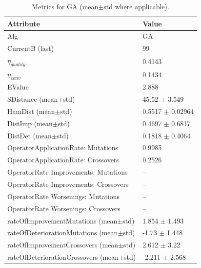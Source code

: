 \begin{table}[t]
\centering
\small
\begin{tabular}{ll}
\toprule
Attribute & Value \\
\midrule
Alg & GA \\
CurrentB (last) & 99 \\
$\eta_{quality}$ & 0.4143 \\
$\eta_{conv}$ & 0.1434 \\
EValue & 2.888 \\
SDistance (mean$\pm$std) & 45.52 $\pm$ 3.549 \\
HamDist (mean$\pm$std) & 0.5517 $\pm$ 0.02964 \\
DistImp (mean$\pm$std) & 0.4697 $\pm$ 0.6817 \\
DistDet (mean$\pm$std) & 0.1818 $\pm$ 0.4064 \\
OperatorApplicationRate: Mutations & 0.9985 \\
OperatorApplicationRate: Crossovers & 0.2526 \\
OperatorRate Improvements: Mutations & -- \\
OperatorRate Improvements: Crossovers & -- \\
OperatorRate Worsenings: Mutations & -- \\
OperatorRate Worsenings: Crossovers & -- \\
rateOfImprovementMutations (mean$\pm$std) & 1.854 $\pm$ 1.493 \\
rateOfDeteriorationMutations (mean$\pm$std) & -1.73 $\pm$ 1.448 \\
rateOfImprovementCrossovers (mean$\pm$std) & 2.612 $\pm$ 3.22 \\
rateOfDeteriorationCrossovers (mean$\pm$std) & -2.211 $\pm$ 2.568 \\
\bottomrule
\end{tabular}
\caption{Metrics for GA (mean$\pm$std where applicable).}
\label{tab:metrics}
\end{table}
